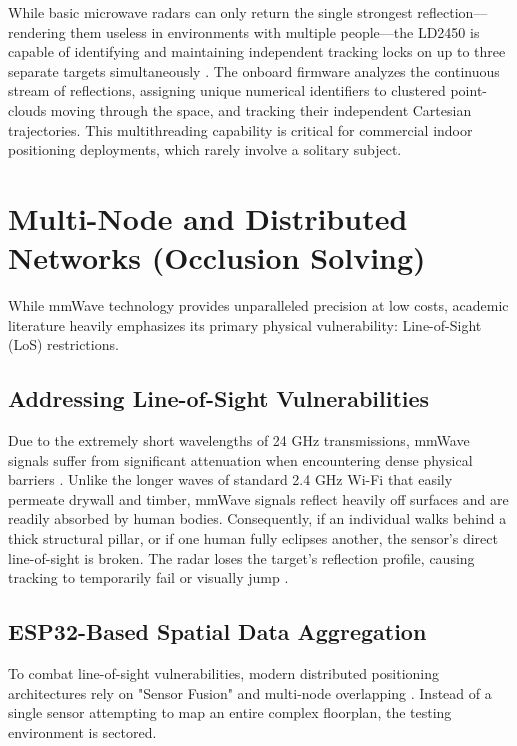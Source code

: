 While basic microwave radars can only return the single strongest reflection—rendering them useless in environments with multiple people—the LD2450 is capable of identifying and maintaining independent tracking locks on up to three separate targets simultaneously \cite{hi-link-ld2450-datasheet}. The onboard firmware analyzes the continuous stream of reflections, assigning unique numerical identifiers to clustered point-clouds moving through the space, and tracking their independent Cartesian trajectories. This multithreading capability is critical for commercial indoor positioning deployments, which rarely involve a solitary subject.

\section{Multi-Node and Distributed Networks (Occlusion Solving)}

While mmWave technology provides unparalleled precision at low costs, academic literature heavily emphasizes its primary physical vulnerability: Line-of-Sight (LoS) restrictions. 

\subsection{Addressing Line-of-Sight Vulnerabilities}

Due to the extremely short wavelengths of 24 GHz transmissions, mmWave signals suffer from significant attenuation when encountering dense physical barriers \cite{rappaport2013millimeter}. Unlike the longer waves of standard 2.4 GHz Wi-Fi that easily permeate drywall and timber, mmWave signals reflect heavily off surfaces and are readily absorbed by human bodies. Consequently, if an individual walks behind a thick structural pillar, or if one human fully eclipses another, the sensor's direct line-of-sight is broken. The radar loses the target's reflection profile, causing tracking to temporarily fail or visually jump \cite{wang2018track}.

\subsection{ESP32-Based Spatial Data Aggregation}

To combat line-of-sight vulnerabilities, modern distributed positioning architectures rely on "Sensor Fusion" and multi-node overlapping \cite{akyildiz2005wireless}. Instead of a single sensor attempting to map an entire complex floorplan, the testing environment is sectored. 

